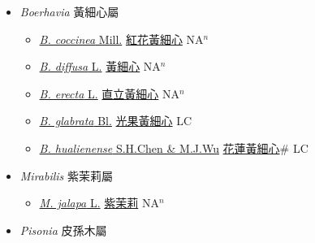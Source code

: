 
  \begin{itemize}
 \item[] \textit{Boerhavia} 黃細心屬
                    
  \begin{itemize}
        \item[] \href{http://www.theplantlist.org/tpl1.1/search?q=Boerhavia+coccinea}{\textit{B. coccinea} Mill.}   \href{\detokenize{http://taibnet.sinica.edu.tw/chi/taibnet_species_list.php?T2=紅花黃細心&T2_new_value=true&fr=y}}{紅花黃細心} NA$^n$
        \item[] \href{http://www.theplantlist.org/tpl1.1/search?q=Boerhavia+diffusa}{\textit{B. diffusa} L.}   \href{\detokenize{http://taibnet.sinica.edu.tw/chi/taibnet_species_list.php?T2=黃細心&T2_new_value=true&fr=y}}{黃細心} NA$^n$
        \item[] \href{http://www.theplantlist.org/tpl1.1/search?q=Boerhavia+erecta}{\textit{B. erecta} L.}   \href{\detokenize{http://taibnet.sinica.edu.tw/chi/taibnet_species_list.php?T2=直立黃細心&T2_new_value=true&fr=y}}{直立黃細心} NA$^n$
        \item[] \href{http://www.theplantlist.org/tpl1.1/search?q=Boerhavia+glabrata}{\textit{B. glabrata} Bl.}   \href{\detokenize{http://taibnet.sinica.edu.tw/chi/taibnet_species_list.php?T2=光果黃細心&T2_new_value=true&fr=y}}{光果黃細心} LC
        \item[] \href{http://www.theplantlist.org/tpl1.1/search?q=Boerhavia+hualienense}{\textit{B. hualienense} S.H.Chen \& M.J.Wu}   \href{\detokenize{http://taibnet.sinica.edu.tw/chi/taibnet_species_list.php?T2=花蓮黃細心&T2_new_value=true&fr=y}}{花蓮黃細心}\# LC
  \end{itemize}
 \item[] \textit{Mirabilis} 紫茉莉屬
                    
  \begin{itemize}
        \item[] \href{http://www.theplantlist.org/tpl1.1/search?q=Mirabilis+jalapa}{\textit{M. jalapa} L.}   \href{\detokenize{http://taibnet.sinica.edu.tw/chi/taibnet_species_list.php?T2=紫茉莉&T2_new_value=true&fr=y}}{紫茉莉} NA$^n$
  \end{itemize}
 \item[] \textit{Pisonia} 皮孫木屬
                    

\end{itemize}
